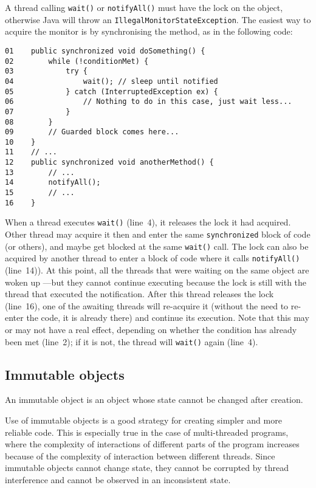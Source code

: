 A thread calling \verb+wait()+ or \verb+notifyAll()+ must have the
lock on the object, otherwise Java will throw an
\verb+IllegalMonitorStateException+. The easiest way to acquire the
monitor is by synchronising the method, as in the following code: 

\begin{verbatim}
01    public synchronized void doSomething() {
02        while (!conditionMet) {
03            try {
04                wait(); // sleep until notified
05            } catch (InterruptedException ex) {
06                // Nothing to do in this case, just wait less...
07            }
08        }  
09        // Guarded block comes here...
10    }
11    // ...
12    public synchronized void anotherMethod() {
13        // ...
14        notifyAll();
15        // ...
16    }
\end{verbatim}

When a thread executes \verb+wait()+ (line~4), it releases the lock it had
acquired. Other thread may acquire it then and enter the same
\verb+synchronized+ block of code (or others), and maybe get blocked
at the same \verb+wait()+ call. The lock can also be acquired by another
thread to enter a block of code where it calls
\verb+notifyAll()+ (line~14)). At
this point, all the threads that were waiting on the same object are
woken up ---but they cannot continue executing because the lock is
still with the thread that executed the notification. After this
thread releases the lock (line~16), one of the awaiting threads will re-acquire
it (without the need to re-enter the code, it is already there) and
continue its execution. Note that this may or may not have a real
effect, depending on whether the condition has already been met (line~2); if it
is not, the thread will \verb+wait()+ again (line~4). 

\subsection{Immutable objects}
\label{sec:immutable-objects}

An immutable object is an object whose state cannot be changed after
creation. 

Use of immutable objects is a good strategy for creating simpler and
more reliable code. This is especially true in the case of
multi-threaded programs, where the complexity of interactions of
different parts of the program increases because of the complexity of
interaction between different threads. Since immutable objects cannot
change state, they cannot be corrupted by thread interference and
cannot be observed in an inconsistent state.

